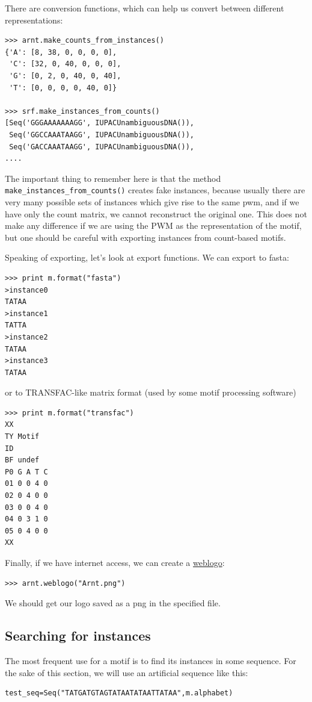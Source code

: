 \documentclass{report}
\begin{document}
There are conversion functions, which can help us convert between
different representations:
\begin{verbatim}
>>> arnt.make_counts_from_instances()
{'A': [8, 38, 0, 0, 0, 0],
 'C': [32, 0, 40, 0, 0, 0],
 'G': [0, 2, 0, 40, 0, 40],
 'T': [0, 0, 0, 0, 40, 0]}

>>> srf.make_instances_from_counts()
[Seq('GGGAAAAAAAGG', IUPACUnambiguousDNA()),
 Seq('GGCCAAATAAGG', IUPACUnambiguousDNA()),
 Seq('GACCAAATAAGG', IUPACUnambiguousDNA()),
....
\end{verbatim}
The important thing to remember here is that the method
\verb|make_instances_from_counts()| creates fake instances, because
usually there are very many possible sets of instances which give rise
to the same pwm, and if we have only the count matrix, we cannot
reconstruct the original one. This does not make any difference if we
are using the PWM as the representation of the motif, but one should
be careful with exporting instances from count-based motifs.

Speaking of exporting, let's look at export functions. We can export to fasta:
\begin{verbatim}
>>> print m.format("fasta")
>instance0
TATAA
>instance1
TATTA
>instance2
TATAA
>instance3
TATAA
\end{verbatim}
or to TRANSFAC-like matrix format (used by some motif processing software)
\begin{verbatim}
>>> print m.format("transfac")
XX
TY Motif
ID 
BF undef
P0 G A T C
01 0 0 4 0
02 0 4 0 0
03 0 0 4 0
04 0 3 1 0
05 0 4 0 0
XX
\end{verbatim}

Finally, if we have internet access, we can create a \href{http://weblogo.berkeley.edu}{weblogo}:
\begin{verbatim}
>>> arnt.weblogo("Arnt.png")
\end{verbatim}
We should get our logo saved as a png in the specified file.

\subsection{Searching for instances}
\label{sec:search}

The most frequent use for a motif is to find its instances in some
sequence. For the sake of this section, we will use an artificial sequence like this:

\begin{verbatim}
test_seq=Seq("TATGATGTAGTATAATATAATTATAA",m.alphabet)
\end{verbatim}
\end{document}
